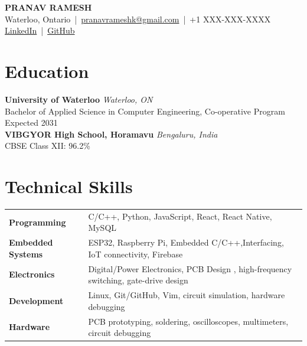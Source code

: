 \documentclass[11pt,letterpaper]{extarticle}
\newcommand{\education}[4]{%
    \textbf{#1} \hfill \textit{#2}\\[-2pt]
    #3 \hfill #4\\[-10pt]
}
\begin{document}
\begin{center}
    {\LARGE\bfseries PRANAV RAMESH}\\[1pt]
    Waterloo, Ontario \,|\, 
    \href{mailto:pranavrameshk@gmail.com}{pranavrameshk@gmail.com}
    \,|\, +1 XXX-XXX-XXXX\\[-1pt]
    \href{https://www.linkedin.com/in/pranav-ramesh-1a1708413/}{LinkedIn}
    \,|\, 
    \href{https://github.com/Pranav2008-droid}{GitHub}
\end{center}

\section{Education}

\education
    {University of Waterloo}
    {Waterloo, ON}
    {Bachelor of Applied Science in Computer Engineering, Co-operative Program}
    {Expected 2031}

\education
    {VIBGYOR High School, Horamavu}
    {Bengaluru, India}
    {CBSE Class XII: 96.2\%}
    {}

\section{Technical Skills}

\begin{tabularx}{\textwidth}{@{}>{\bfseries}p{1.7in}X@{}}
Programming &
    C/C++, Python, JavaScript, React, React Native, MySQL \\[3pt]

Embedded 
Systems &
ESP32, Raspberry Pi, Embedded C/C++,Interfacing,
IoT connectivity, Firebase \\[3pt]

Electronics &
Digital/Power Electronics, PCB Design ,
high-frequency switching, gate-drive design\\[3pt]

Development &
Linux, Git/GitHub, Vim, circuit simulation, hardware debugging \\[3pt]

Hardware &
    PCB prototyping, soldering, oscilloscopes, multimeters, circuit debugging\\[5pt]
\end{tabularx}
\end{document}
